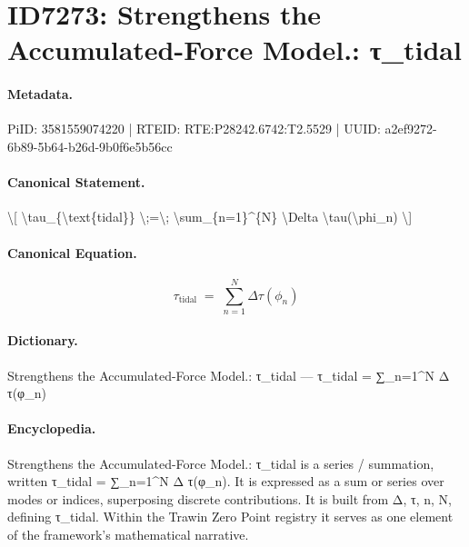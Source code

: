 \section*{ID7273: Strengthens the Accumulated-Force Model.: τ\_tidal}
\paragraph{Metadata.}
PiID: 3581559074220 | RTEID: RTE:P28242.6742:T2.5529 | UUID: a2ef9272-6b89-5b64-b26d-9b0f6e5b56cc

\paragraph{Canonical Statement.}
\textbackslash{}[ \textbackslash{}tau\_\{\textbackslash{}text\{tidal\}\} \textbackslash{};=\textbackslash{}; \textbackslash{}sum\_\{n=1\}\textasciicircum{}\{N\} \textbackslash{}Delta \textbackslash{}tau(\textbackslash{}phi\_n) \textbackslash{}]

\paragraph{Canonical Equation.}
\[
\tau_{\text{tidal}} \;=\; \sum_{n=1}^{N} \Delta \tau(\phi_n)
\]

\paragraph{Dictionary.}
Strengthens the Accumulated-Force Model.: τ\_tidal — τ\_tidal = ∑\_n=1\textasciicircum{}N Δ τ(φ\_n)

\paragraph{Encyclopedia.}
Strengthens the Accumulated-Force Model.: τ\_tidal is a series / summation, written τ\_tidal = ∑\_n=1\textasciicircum{}N Δ τ(φ\_n). It is expressed as a sum or series over modes or indices, superposing discrete contributions. It is built from Δ, τ, n, N, defining τ\_tidal. Within the Trawin Zero Point registry it serves as one element of the framework's mathematical narrative.
